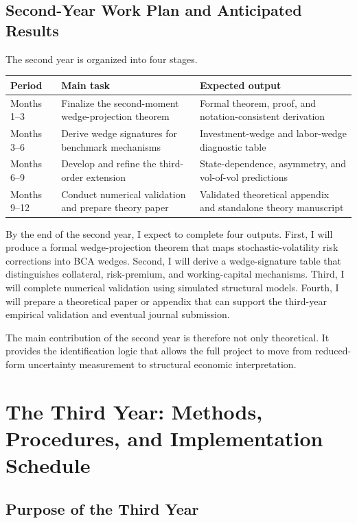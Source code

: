 \documentclass[12pt]{article}
\begin{document}
\subsection{Second-Year Work Plan and Anticipated Results}

The second year is organized into four stages.

\begin{center}
\begin{tabular}{p{}p{}p{}}
\toprule
Period & Main task & Expected output \\
\midrule
Months 1--3 &
Finalize the second-moment wedge-projection theorem &
Formal theorem, proof, and notation-consistent derivation \\
\addlinespace
Months 3--6 &
Derive wedge signatures for benchmark mechanisms &
Investment-wedge and labor-wedge diagnostic table \\
\addlinespace
Months 6--9 &
Develop and refine the third-order extension &
State-dependence, asymmetry, and vol-of-vol predictions \\
\addlinespace
Months 9--12 &
Conduct numerical validation and prepare theory paper &
Validated theoretical appendix and standalone theory manuscript \\
\bottomrule
\end{tabular}
\end{center}

By the end of the second year, I expect to complete four outputs. First, I will produce a formal
wedge-projection theorem that maps stochastic-volatility risk corrections into BCA wedges.
Second, I will derive a wedge-signature table that distinguishes collateral, risk-premium, and
working-capital mechanisms. Third, I will complete numerical validation using simulated
structural models. Fourth, I will prepare a theoretical paper or appendix that can support the
third-year empirical validation and eventual journal submission.

The main contribution of the second year is therefore not only theoretical. It provides the
identification logic that allows the full project to move from reduced-form uncertainty
measurement to structural economic interpretation.

\section{The Third Year: Methods, Procedures, and Implementation Schedule}

\subsection{Purpose of the Third Year}
\end{document}
